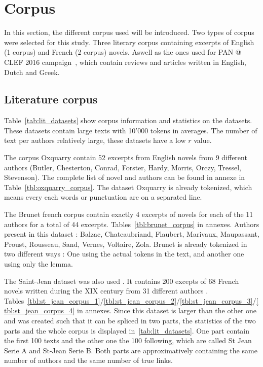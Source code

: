 \section{Corpus}

In this section, the different corpus used will be introduced.
Two types of corpus were selected for this study.
Three literary corpus containing excerpts of English (1 corpus) and French (2 corpus) novels.
Aswell as the ones used for PAN @ CLEF 2016 campaign~\cite{pan16}, which contain reviews and articles written in English, Dutch and Greek.

\subsection{Literature corpus}
\label{sec:lit_corpus}

Table~\ref{tab:lit_datasets} show corpus information and statistics on the datasets.
These datasets contain large texts with 10'000 tokens in averages.
The number of text per authors relatively large, these datasets have a low $r$ value.

The corpus Oxquarry contain 52 excerpts from English novels from 9 different authors (Butler, Chesterton, Conrad, Forster, Hardy, Morris, Orczy, Tressel, Stevenson).
The complete list of novel and authors can be found in annexe in Table~\ref{tbl:oxquarry_corpus}.
The dataset Oxquarry is already tokenized, which means every each words or punctuation are on a separated line.

The Brunet french corpus contain exactly 4 excerpts of novels for each of the 11 authors for a total of 44 excerpts.
Tables~\ref{tbl:brunet_corpus} in annexes.
Authors present in this dataset : Balzac, Chateaubriand, Flaubert, Marivaux, Maupassant, Proust, Rousseau, Sand, Vernes, Voltaire, Zola.
Brunet is already tokenized in two different ways : One using the actual tokens in the text, and another one using only the lemma.

The Saint-Jean dataset was also used \cite{unine_corpus}.
It contains 200 excepts of 68 French novels written during the XIX century from 31 different authors \cite{st_jean}.
Tables~\ref{tbl:st_jean_corpus_1}/\ref{tbl:st_jean_corpus_2}/\ref{tbl:st_jean_corpus_3}/\ref{tbl:st_jean_corpus_4} in annexes.
Since this dataset is larger than the other one and was created such that it can be spliced in two parts, the statistics of the two parts and the whole corpus is displayed in~\ref{tab:lit_datasets}.
One part contain the first 100 texts and the other one the 100 following, which are called St Jean Serie A and St-Jean Serie B.
Both parts are approximatively containing the same number of authors and the same number of true links.

